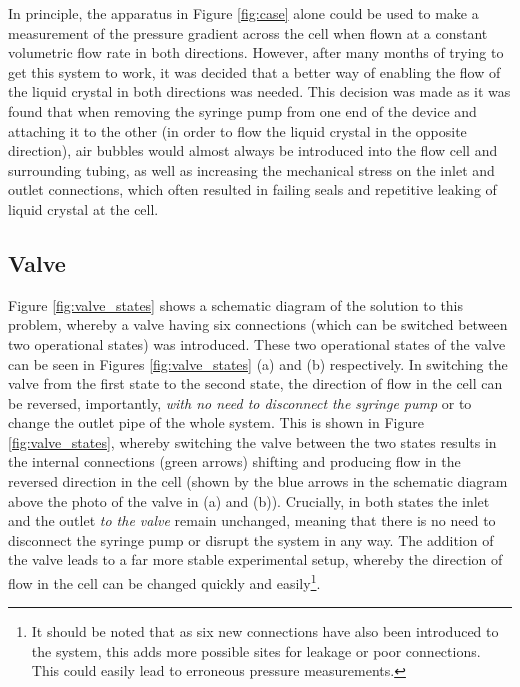 In principle, the apparatus in Figure \ref{fig:case} alone could be used to make a measurement of the pressure gradient across the cell when flown at a constant volumetric flow rate in both directions. However, after many months of trying to get this system to work, it was decided that a better way of enabling the flow of the liquid crystal in both directions was needed. This decision was made as it was found that when removing the syringe pump from one end of the device and attaching it to the other (in order to flow the liquid crystal in the opposite direction), air bubbles would almost always be introduced into the flow cell and surrounding tubing, as well as increasing the mechanical stress on the inlet and outlet connections, which often resulted in failing seals and repetitive leaking of liquid crystal at the cell.

\subsection{Valve}
Figure \ref{fig:valve_states} shows a schematic diagram of the solution to this problem, whereby a valve having six connections (which can be switched between two operational states) was introduced. These two operational states of the valve can be seen in Figures \ref{fig:valve_states} (a) and (b) respectively. In switching the valve from the first state to the second state, the direction of flow in the cell can be reversed, importantly, \textit{with no need to disconnect the syringe pump} or to change the outlet pipe of the whole system. This is shown in Figure \ref{fig:valve_states}, whereby switching the valve between the two states results in the internal connections (green arrows) shifting and producing flow in the reversed direction in the cell (shown by the blue arrows in the schematic diagram above the photo of the valve in (a) and (b)). Crucially, in both states the inlet and the outlet \textit{to the valve} remain unchanged, meaning that there is no need to disconnect the syringe pump or disrupt the system in any way. The addition of the valve leads to a far more stable experimental setup, whereby the direction of flow in the cell can be changed quickly and easily\footnote{It should be noted that as six new connections have also been introduced to the system, this adds more possible sites for leakage or poor connections. This could easily lead to erroneous pressure measurements.}. 


